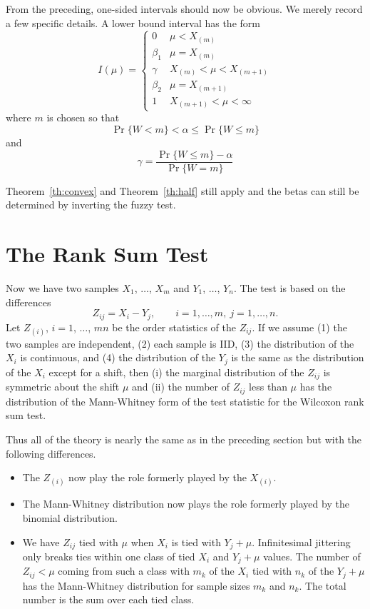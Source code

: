 \documentclass{article}
\begin{document}
From the preceding, one-sided intervals should now be obvious.
We merely record a few specific details.  A lower bound interval
has the form
\begin{equation} \label{non-degenerate-low}
   I(\mu)
   =
   \begin{cases}
   0 & \mu < X_{(m)}
   \\
   \beta_1 & \mu = X_{(m)}
   \\
   \gamma & X_{(m)} < \mu < X_{(m + 1)}
   \\
   \beta_2 & \mu = X_{(m + 1)}
   \\
   1 & X_{(m + 1)} < \mu < \infty
   \end{cases}
\end{equation}
where $m$ is chosen so that
\begin{equation} \label{quantile-low}
   \Pr \{ W < m \} < \alpha \le \Pr \{ W \le m \}
\end{equation}
and
\begin{equation} \label{gamma-low}
   \gamma = \frac{\Pr \{ W \le m \} - \alpha}{\Pr \{ W = m \}}
\end{equation}

Theorem~\ref{th:convex} and Theorem~\ref{th:half} still apply
and the betas can still be determined by inverting the fuzzy test.

\section{The Rank Sum Test}

Now we have two samples $X_1$, $\ldots$, $X_m$ and $Y_1$, $\ldots$, $Y_n$.
The test is based on the differences
$$
   Z_{i j} = X_i - Y_j, \qquad i = 1, \ldots, m, \ j = 1, \ldots, n.
$$
Let $Z_{(i)}$, $i = 1$, $\ldots$, $m n$ be the order statistics of the
$Z_{i j}$.  If we assume (1) the two samples are independent,
(2) each sample is IID, (3) the distribution of the $X_i$ is continuous,
and (4) the distribution of the $Y_j$ is the same as the distribution of
the $X_i$ except for a shift, then (i) the marginal distribution of the
$Z_{i j}$ is symmetric about the shift $\mu$ and (ii) the number of
$Z_{i j}$ less than $\mu$ has the distribution of the Mann-Whitney form
of the test statistic for the Wilcoxon rank sum test.

Thus all of the theory is nearly the same as in the preceding section
but with the following differences.
\begin{itemize}
\item The $Z_{(i)}$ now play the role formerly played by the $X_{(i)}$.
\item The Mann-Whitney distribution now plays the role formerly played by
    the binomial distribution.
\item We have $Z_{i j}$ tied with $\mu$ when $X_i$ is tied with $Y_j + \mu$.
    Infinitesimal jittering only breaks ties within one class of tied
    $X_i$ and $Y_j + \mu$ values.  The number of $Z_{i j} < \mu$ coming from
    such a class with $m_k$ of the $X_i$ tied with $n_k$ of the $Y_j + \mu$
    has the Mann-Whitney distribution for sample sizes $m_k$ and $n_k$.
    The total number is the sum over each tied class.
\end{itemize}
\end{document}

